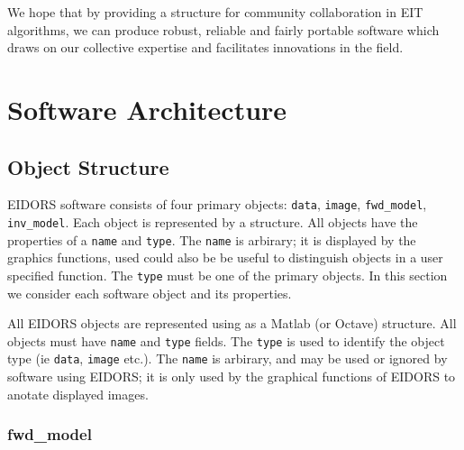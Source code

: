 \documentclass[12pt]{iopart}
\begin{document}
\begin{itemize}
%

\end{itemize}
We hope that by providing a structure for community collaboration
in EIT algorithms, we can produce robust,
reliable and fairly portable software which draws on our collective
expertise and facilitates innovations in the field.

\section{Software Architecture}

\subsection{Object Structure}

EIDORS software consists of four primary objects:
{\tt data},
{\tt image},
{\tt fwd\_model},
{\tt inv\_model}. Each object is represented by a
structure. All objects have the properties of a
{\tt name} and {\tt type}. The {\tt name} is
arbirary; it is displayed by the graphics functions,
used could also be be useful to distinguish objects
in a user specified function. The {\tt type} must
be one of the primary objects. In this section we
consider each software object and its properties.


All EIDORS objects are represented using as a Matlab
(or Octave) structure. All objects must have 
{\tt name} and {\tt type} fields. 
The {\tt type} is used to identify the object type 
(ie {\tt data}, {\tt image} etc.).
The {\tt name} is arbirary, and may be used or ignored
by software using EIDORS; it is only used by the
graphical functions of EIDORS to anotate displayed images.

\subsubsection{fwd\_model}
\end{document}
